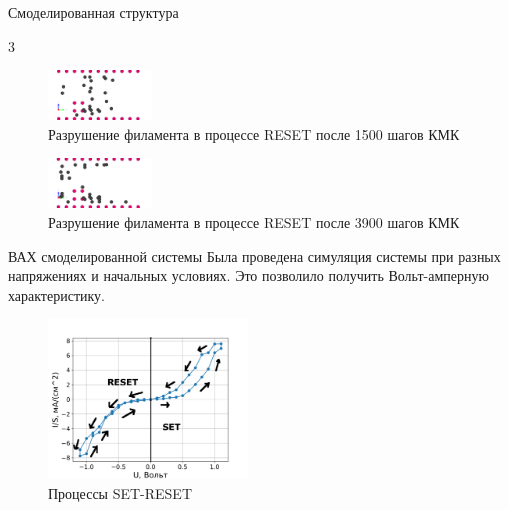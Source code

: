 \documentclass{beamer}%
\begin{document}
\begin{frame}{Смоделированная структура}{}
\begin {multicols} {3}
\begin{figure}
    \centering
    \includegraphics[height=50px]{img/150.pdf}
    \caption{Разрушение филамента в процессе RESET после 1500 шагов КМК
    }
\end{figure}

\begin{figure}
    \centering
    \includegraphics[height=50px]{img/390.pdf}
    \caption{Разрушение филамента в процессе RESET после 3900 шагов КМК
    }
\end{figure}
\end{multicols}
\end{frame}

\begin{frame}{ВАХ смоделированной системы}
    Была проведена симуляция системы при разных напряжениях и начальных условиях.
    Это позволило получить Вольт-амперную характеристику.
        \begin{figure}
            \centering
            \includegraphics[width=200px]{img/VAH_omg_ex.pdf}
            \caption {Процессы SET-RESET}
        \end{figure}

\end{frame}
\end{document}
